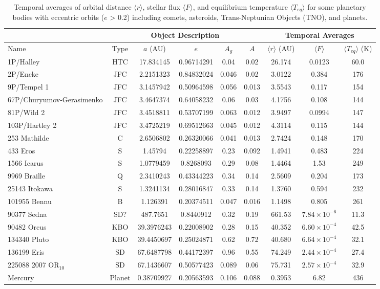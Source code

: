 \documentclass[a4paper,fleqn,usenatbib]{mnras}
\begin{document}
\begin{table}
\begin{threeparttable}
\centering
\caption{Temporal averages of orbital distance $\langle r \rangle$, stellar flux $\langle F \rangle$, and equilibrium temperature $\langle T_{eq} \rangle$ for some  planetary bodies with eccentric orbits ($e$ > 0.2) including comets, asteroids, Trans-Neptunian Objects (TNO), and planets.}
\begin{tabular}{ l c c c c c c c c }
 \hline
 \hline
 & \multicolumn{5}{c}{Object Description\tnote{a}} & \multicolumn{3}{c}{Temporal Averages\tnote{d}} \\
 \hline
 Name & Type & $a$ (AU) & $e$ & $A_g$\tnote{b} & $A$\tnote{c} & $\langle r \rangle$ (AU) & $\langle F \rangle$ & $\langle T_{eq} \rangle$ (K) \\ 
 \hline
 1P/Halley & HTC & 17.834145 & 0.96714291 & 0.04 & 0.02 & 26.174  & 0.0123 & 60.0 \\  
 2P/Encke & JFC & 2.2151323 & 0.84832024 & 0.046 & 0.02 & 3.0122 & 0.384 & 176 \\
 9P/Tempel 1 & JFC & 3.1457942 & 0.50964598 & 0.056 & 0.013 & 3.5543 & 0.117 & 154 \\
 67P/Churyumov-Gerasimenko & JFC & 3.4647374 & 0.64058232 & 0.06 & 0.03 & 4.1756  & 0.108 & 144 \\
 81P/Wild 2 & JFC & 3.4518811 & 0.53707199 & 0.063 & 0.012 & 3.9497 & 0.0994 & 147 \\ 
 103P/Hartley 2 & JFC & 3.4725219 & 0.69512663 & 0.045 & 0.012 & 4.3114 & 0.115 & 144 \\
 253 Mathilde & C & 2.6506802 & 0.26320066 & 0.041 & 0.013 & 2.7424 & 0.148 & 170 \\
 433 Eros & S & 1.45794 & 0.22258897 & 0.23 & 0.092 & 1.4941 & 0.483 & 224 \\
 1566 Icarus & S & 1.0779459 & 0.8268093 & 0.29 & 0.08 & 1.4464  & 1.53 & 249 \\
 9969 Braille & Q & 2.3410243 & 0.43344223 & 0.34 & 0.14 & 2.5609 & 0.204 & 173 \\
 25143 Itokawa & S & 1.3241134 & 0.28016847 & 0.33 & 0.14 & 1.3760 & 0.594 & 232 \\
 101955	Bennu & B & 1.126391 & 0.20374511 & 0.047 & 0.016   & 1.1498 & 0.805 & 261 \\
 90377 Sedna & SD? & 487.7651 & 0.8440912 & 0.32 & 0.19 & 661.53  & $7.84\times10^{-6}$ & 11.3 \\
 90482 Orcus & KBO & 39.3976243 & 0.22008902 & 0.28 & 0.15 & 40.352 & $6.60\times10^{-4}$ & 42.5 \\
 134340 Pluto & KBO & 39.4450697 & 0.25024871 & 0.62 & 0.72 & 40.680 & $6.64\times10^{-4}$ & 32.1 \\
 136199 Eris & SD & 67.6487798 & 0.44172397 & 0.96 & 0.55 & 74.249 & $2.44\times10^{-4}$ & 27.4 \\
 225088	2007 OR$_{10}$ & SD & 67.1436607 & 0.50577423 & 0.089 & 0.06 & 75.731 & $2.57\times10^{-4}$ & 32.9 \\
 Mercury & Planet & 0.38709927 & 0.20563593 & 0.106 & 0.088 & 0.3953 & 6.82 & 436 \\


\end{tabular}
\end{threeparttable}
\end{table}
\end{document}
